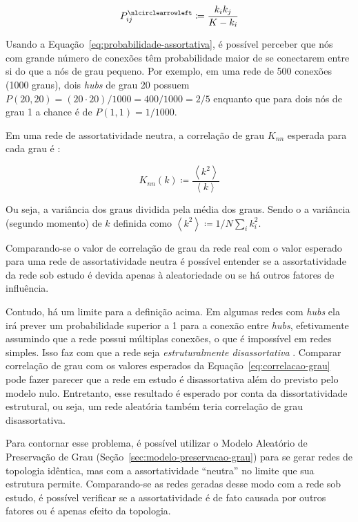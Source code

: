 \documentclass[12pt,a4paper]{article}
\theoremstyle{hypo}
\newcommand{\avg}[1]{\left\langle #1 \right\rangle} %
\newcommand{\defn}{\coloneqq} %
\newcommand{\noloop}[1]{#1^\nlcirclearrowleft} %
\begin{document}
\begin{equation}
\noloop{P}_{ij} \defn \frac{k_i k_j}{K - k_i}
\end{equation}

Usando a Equação~\ref{eq:probabilidade-assortativa}, é possível perceber que nós com grande número de conexões têm probabilidade maior de se conectarem entre si do que a nós de grau pequeno. Por exemplo, em uma rede de 500 conexões (1000 graus), dois \textit{hubs} de grau 20 possuem $P(20, 20) = (20 \cdot 20) / 1000 = 400 / 1000 = 2 / 5$ enquanto que para dois nós de grau 1 a chance é de $P(1, 1) = 1 / 1000$.

Em uma rede de assortatividade neutra, a correlação de grau $K_\textit{nn}$ esperada para cada grau é \cite{Barabasi2016-rn}:

\begin{equation} \label{eq:correlacao-grau}
K_\textit{nn}(k) \defn \frac{\avg{k^2}}{\avg{k}}
\end{equation}

Ou seja, a variância dos graus dividida pela média dos graus. Sendo o a variância (segundo momento) de $k$ definida como $\avg{k^2} \defn 1/N \sum_i k_i^2$.

Comparando-se o valor de correlação de grau da rede real com o valor esperado para uma rede de assortatividade neutra é possível entender se a assortatividade da rede sob estudo é devida apenas à aleatoriedade ou se há outros fatores de influência.

Contudo, há um limite para a definição acima. Em algumas redes com \textit{hubs} ela irá prever um probabilidade superior a 1 para a conexão entre \textit{hubs}, efetivamente assumindo que a rede possui múltiplas conexões, o que é impossível em redes simples. Isso faz com que a rede seja \textit{estruturalmente disassortativa} \cite{Barabasi2016-rn}. Comparar correlação de grau com os valores esperados da Equação~\ref{eq:correlacao-grau} pode fazer parecer que a rede em estudo é disassortativa além do previsto pelo modelo nulo. Entretanto, esse resultado é esperado por conta da dissortatividade estrutural, ou seja, um rede aleatória também teria correlação de grau disassortativa.

Para contornar esse problema, é possível utilizar o Modelo Aleatório de Preservação de Grau (Seção~\ref{sec:modelo-preservacao-grau}) para se gerar redes de topologia idêntica, mas com a assortatividade \enquote{neutra} no limite que sua estrutura permite. Comparando-se as redes geradas desse modo com a rede sob estudo, é possível verificar se a assortatividade é de fato causada por outros fatores ou é apenas efeito da topologia.
\end{document}
